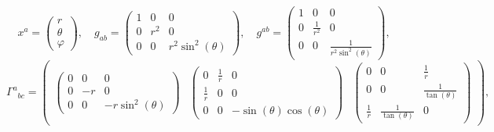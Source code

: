\documentclass[11pt]{article}
\begin{document}
    $$x^{a}=\begin{pmatrix}r\\\theta\\\varphi\end{pmatrix},\quad g_{ab}=\begin{pmatrix} 1 & 0 & 0\\ 0 & r^{2} & 0\\ 0 & 0 & r^{2} \sin^{2}{\left(\theta \right)} \end{pmatrix},\quad g^{ab}=\begin{pmatrix} 1 & 0 & 0\\ 0 & \frac{1}{r^{2}} & 0\\ 0 & 0 & \frac{1}{r^{2} \sin^{2}{\left(\theta \right)}} \end{pmatrix},$$
$${\Gamma^{a}}_{bc}=\begin{pmatrix} \begin{pmatrix} 0 & 0 & 0\\ 0 & - r & 0\\ 0 & 0 & - r \sin^{2}{\left(\theta \right)} \end{pmatrix} & \begin{pmatrix} 0 & \frac{1}{r} & 0\\ \frac{1}{r} & 0 & 0\\ 0 & 0 & - \sin{\left(\theta \right)} \cos{\left(\theta \right)} \end{pmatrix} & \begin{pmatrix} 0 & 0 & \frac{1}{r}\\ 0 & 0 & \frac{1}{\tan{\left(\theta \right)}}\\ \frac{1}{r} & \frac{1}{\tan{\left(\theta \right)}} & 0 \end{pmatrix} \end{pmatrix},$$
\end{document}
